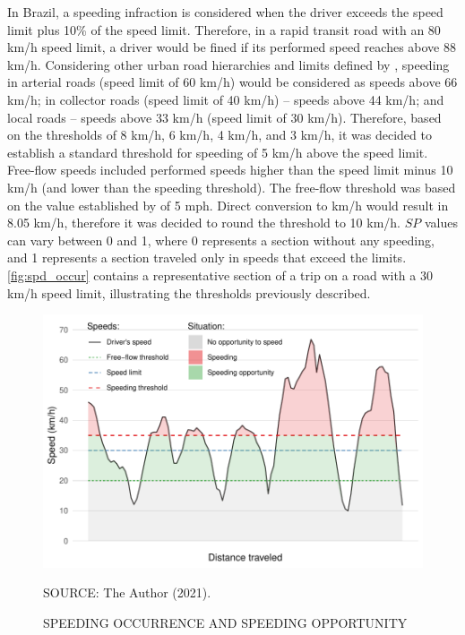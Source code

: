 In Brazil, a speeding infraction is considered when the driver exceeds the speed limit plus 10\% of the speed limit. Therefore, in a rapid transit road with an 80 km/h speed limit, a driver would be fined if its performed speed reaches above 88 km/h. Considering other urban road hierarchies and limits defined by \textcite{Brasil1997}, speeding in arterial roads (speed limit of 60 km/h) would be considered as speeds above 66 km/h; in collector roads (speed limit of 40 km/h) – speeds above 44 km/h; and local roads – speeds above 33 km/h (speed limit of 30 km/h). Therefore, based on the thresholds of 8 km/h, 6 km/h, 4 km/h, and 3 km/h, it was decided to establish a standard threshold for speeding of 5 km/h above the speed limit. Free-flow speeds included performed speeds higher than the speed limit minus 10 km/h (and lower than the speeding threshold). The free-flow threshold was based on the value established by \textcite{Richard2017} of 5 mph. Direct conversion to km/h would result in 8.05 km/h, therefore it was decided to round the threshold to 10 km/h. $SP$ values can vary between 0 and 1, where 0 represents a section without any speeding, and 1 represents a section traveled only in speeds that exceed the limits. \autoref{fig:spd_occur} contains a representative section of a trip on a road with a 30 km/h speed limit, illustrating the thresholds previously described.   


\begin{figure}[!htbp]
    \centering\footnotesize
    \captionsetup{font=footnotesize}
    \caption{SPEEDING OCCURRENCE AND SPEEDING OPPORTUNITY}
    \includegraphics{fig/spd_occur.pdf}
    \label{fig:spd_occur}
    \par SOURCE: The Author (2021).
\end{figure}

